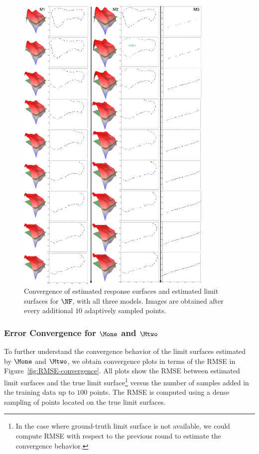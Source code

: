 \begin{figure}[t]
  \centering
  \includegraphics[width=0.85\textwidth]{figs/chap5/nuclear-F-surface-converge.pdf}
  \caption{Convergence of estimated response surfaces and estimated limit surfaces for $\protect\NF$,  with all three models. Images are obtained after every additional $10$ adaptively sampled points.}
  \label{fig:nuclear-F-surface-converge}
\end{figure}

\clearpage

\subsubsection{Error Convergence for $\protect\Mone$ and $\protect\Mtwo$}

To further understand the convergence behavior of the limit surfaces estimated by $\Mone$ and $\Mtwo$, we obtain convergence plots in terms of the RMSE in Figure~\ref{fig:RMSE-convergence}.
%
All plots show the RMSE between estimated limit surfaces and the true limit surface\footnote{In the case where ground-truth limit surface is not available, we could compute RMSE with respect to the previous round to estimate the convergence behavior.} versus the number of samples added in the training data up to $100$ points.
%
The RMSE is computed using a dense sampling of points located on the true limit surfaces.

